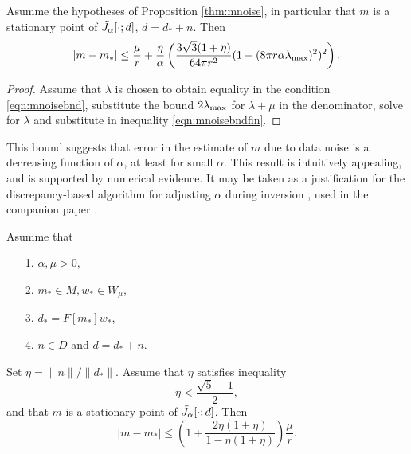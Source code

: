 \begin{corollary}
  \label{thm:mnoisecor}
  Asumme the hypotheses of Proposition \ref{thm:mnoise}, in particular
  that $m$ is a stationary point of $\tilde{J}_{\alpha}[\cdot;d]$, $d=d_*+n$. Then
  \begin{equation}
    \label{eqn:mnoisecor}
    |m-m_*| \le \frac{\mu}{r} + \frac{\eta}{\alpha} \left(\frac{3\sqrt{3}(1+\eta)}{64\pi r^2}(1+(8\pi r \alpha
      \lambda_{\rm max})^2)^2\right).
  \end{equation}
\end{corollary}

\begin{proof} Assume that $\lambda$ is chosen to obtain equality in
  the condition \ref{eqn:mnoisebnd}, substitute the bound $2
  \lambda_{\rm max}$ for $\lambda + \mu$ in the denominator, solve for
  $\lambda$ and substitute in inequality \ref{eqn:mnoisebndfin}.
\end{proof}

 This bound suggests that error in the estimate
of $m$ due to data noise is a decreasing function of $\alpha$, at
least for small $\alpha$. This result is intuitively appealing, and is
supported by numerical evidence. It may be taken as a justification
for the discrepancy-based algorithm for adjusting $\alpha$ during
inversion \cite[]{FuSymes2017discrepancy}, used in the companion paper
\cite[]{SymesChenMinkoff:21}. 

\begin{theorem}
  \label{thm:mnoiseres}
  Asumme that
  \begin{itemize}
  \item[1. ] $\alpha, \mu> 0$,
  \item[2. ] $m_* \in M, w_* \in W_{\mu}$,
  \item[3. ] $d_* = F[m_*]w_*$,
  \item[4. ] $n \in D$ and $d = d_* + n$.
  \end{itemize}
  Set $\eta = \|n\|/\|d_*\|$. Assume that $\eta$ satisfies inequality \begin{equation}
  \label{eqn:mnoisecond}    
  \eta < \frac{\sqrt{5}-1}{2},
  \end{equation}
  and that $m$ is a stationary point of $\tilde{J}_{\alpha}[\cdot;d]$.
  Then
  \begin{equation}
    \label{eqn:mnoisesuff}
    |m-m_*| \le \left(1+\frac{2\eta(1+\eta)}{1-\eta(1+\eta)}\right)\frac{\mu}{r}.
  \end{equation}
\end{theorem}

